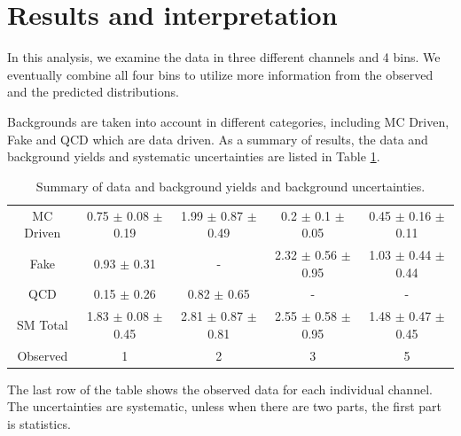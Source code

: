 \section{Results and interpretation}
\label{sect:stat}
In this analysis, we examine the data in three different channels and 4 bins.
We eventually combine all four bins to utilize more information from the observed and the predicted distributions.

Backgrounds are taken into account in different categories, including MC Driven, Fake and QCD which are data driven.
As a summary of results, the data and background yields and systematic uncertainties are listed in Table \ref{tbl:yieldSysSummary}. 
\begin{table}[h]
\begin{center}
\begin{tabular}{c|c|c|c|c}
\hline
\hline
		& \tauTau\binone & \tauTau\bintwo & \eTau\binone & \muTau\binone \\
\hline
MC Driven& 0.75 $\pm$ 0.08 $\pm$ 0.19 & 1.99 $\pm$ 0.87 $\pm$ 0.49  & 0.2 $\pm$ 0.1 $\pm$ 0.05 & 0.45 $\pm$ 0.16  $\pm$ 0.11\\
Fake     &     0.93 $\pm$ 0.31         &           -                 &     2.32 $\pm$ 0.56 $\pm$  0.95 & 1.03 $\pm$ 0.44 $\pm$ 0.44\\
QCD     &     0.15 $\pm$ 0.26         &         0.82 $\pm$ 0.65     &           -              &            -       \\
\hline
SM Total  & 1.83 $\pm$ 0.08 $\pm$ 0.45 & 2.81  $\pm$ 0.87 $\pm$0.81  & 2.55 $\pm$ 0.58 $\pm$ 0.95 & 1.48 $\pm$ 0.47  $\pm$ 0.45\\
\hline
\hline
Observed   & 1     & 2     & 3   & 5 \\  
\hline
\hline
\end{tabular}
\caption{Summary of data and background yields and background uncertainties.}
\label{tbl:yieldSysSummary}
\end{center}
\end{table}
The last row of the table shows the observed data for  each individual channel.  The uncertainties are systematic, unless when there are 
two parts, the first part is statistics.

